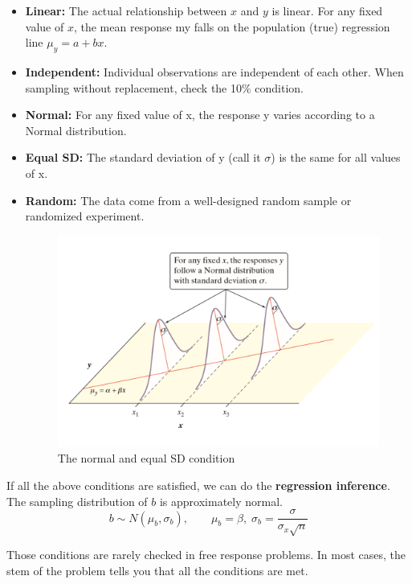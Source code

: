 \documentclass[a4paper, 12pt,twoside]{book}
\begin{document}
\begin{itemize}
  \begin{itemize}
    \item \textbf{Linear:} The actual relationship between $x$ and $y$ is linear. For any fixed value of $x$, the mean response my falls on the population (true) regression line $\mu_y = a + bx$.
    \item \textbf{Independent:} Individual observations are independent of each other. When sampling without replacement, check the 10\% condition.
    \item \textbf{Normal:} For any fixed value of x, the response y varies according to a  Normal distribution.
    \item \textbf{Equal SD:} The standard deviation of y (call it $\sigma$) is the same for all values of x.
     \item \textbf{Random:} The data come from a well-designed random sample or randomized experiment.
    \begin{figure}[H]
    \centering
    \includegraphics[scale=0.5]{InferenceForRegressionLineLinear}
    \caption[Caption for LOF]{The normal and equal SD condition   \protect\footnotemark}
    \label{InferenceForRegressionLineLinear}
    \end{figure}
     \end{itemize} 
       
  If all the above conditions are satisfied, we can do the \textbf{regression inference}. The sampling distribution of $b$ is approximately normal.
  $$b\sim N(\mu_b, \sigma_b), \qquad \mu_b = \beta,\; \sigma_b = \frac{\sigma}{\sigma_x \sqrt{n}}$$
    
    \colorbox{babypink}{\parbox{\textwidth}{
    Those conditions are rarely checked in free response problems. In most cases, the stem of the problem tells you that all the conditions are met.
    }}
    \end{itemize}
\end{document}
